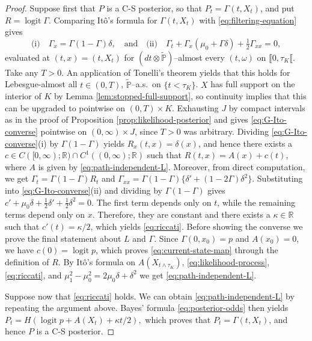\documentclass[11pt, reqno]{amsart}
\theoremstyle{plain}
\theoremstyle{remark}
\newcommand{\logit}{\operatorname{logit}}
\numberwithin{equation}{section}
\begin{document}
\begin{proof}
Suppose first that $P$ is a C-S posterior, so that
$P_t=\Gamma(t,X_t)$, and put $R=\logit \Gamma$. Comparing It\^o's formula for
$\Gamma(t,X_t)$ with \eqref{eq:filtering-equation} gives
\begin{equation}\label{eq:G-Ito-converse}
\text{(i)} \quad \Gamma_x=\Gamma(1-\Gamma)\delta,\quad \text{and} \quad
\text{(ii)} \quad \Gamma_t+\Gamma_x(\mu_0+\Gamma \delta)
+\tfrac12\Gamma_{xx}=0,
\end{equation}
%
%
%
%
%
evaluated at $(t,x)=(t,X_t)$ for $(dt\otimes \widetilde{\mathbb P})$--almost every $(t,\omega)$ on $\llbracket 0,\tau_K\llbracket$. Take any $T>0$. An application of Tonelli's theorem yields that this holds for Lebesgue-almost all $t\in(0,T)$, $\widetilde{\mathbb{P}}$--a.s.~on $\{t<\tau_K\}$. $X$ has full support on the interior of $K$ by Lemma \ref{lem:stopped-full-support}, so continuity implies that this can be upgraded to pointwise on $(0,T)\times K$. Exhausting $J$ by compact intervals as in the proof of Proposition \ref{prop:likelihood-posterior} and gives
\eqref{eq:G-Ito-converse} pointwise on $(0,\infty)\times J$,
since $T>0$ was arbitrary. 
Dividing \eqref{eq:G-Ito-converse}(i)
%
by $\Gamma(1-\Gamma)$ yields $R_x(t,x)=\delta(x)$,
and hence there exists a $c\in C([0,\infty);\mathbb R)\cap C^{1}((0,\infty);\mathbb R)$ such that $R(t,x)=A(x)+c(t)$, where $A$ is given by
\eqref{eq:path-independent-L}. Moreover, from direct computation, we get $\Gamma_t=\Gamma(1-\Gamma)R_t$ and $\Gamma_{xx}
=\Gamma(1-\Gamma)\{\delta'+(1-2\Gamma)\delta^2\}$.
Substituting into \eqref{eq:G-Ito-converse}(ii)
%
and dividing by $\Gamma(1-\Gamma)$
gives $c'+\mu_0\delta
+\frac12\delta'+\frac12\delta^2=0$.
The first term depends only on $t$, while the remaining terms depend
only on $x$. Therefore, they are constant and there exists a $\kappa\in\mathbb{R}$ such that $c'(t)=\kappa/2$, which yields \eqref{eq:riccati}. Before showing the converse we prove the final statement about $L$ and $\Gamma$.
Since $\Gamma(0,x_0)=p$ and $A(x_0)=0$, we have
\(c(0)=\logit p\), which proves \eqref{eq:current-state-map} through the definition of $R$. By It\^o's formula on $A(X_{t\wedge\tau_K})$, \eqref{eq:likelihood-process}, \eqref{eq:riccati}, and $\mu_1^2-\mu_0^2=2\mu_0\delta+\delta^2$ we get \eqref{eq:path-independent-L}. 

Suppose now that \eqref{eq:riccati} holds. We can obtain \eqref{eq:path-independent-L} by repeating the argument above. Bayes' formula \eqref{eq:posterior-odds} then yields
\(
P_{t}
=
H\left(
\logit p+A(X_{t})
+\kappa t/2
\right),
\)
which proves that $P_t=\Gamma(t,X_t)$, and hence $P$ is a C-S posterior.
\end{proof}
\end{document}
